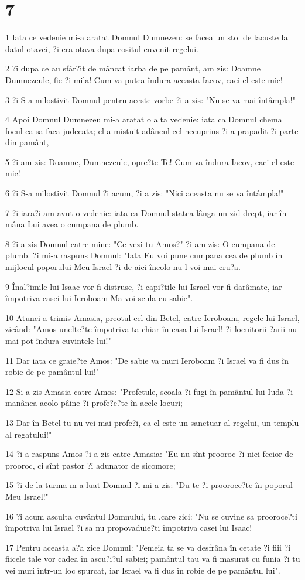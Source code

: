 \chapter{7}

\par 1 Iata ce vedenie mi-a aratat Domnul Dumnezeu: se facea un stol de lacuste la datul otavei, ?i era otava dupa cositul cuvenit regelui.
\par 2 ?i dupa ce au sfâr?it de mâncat iarba de pe pamânt, am zis: Doamne Dumnezeule, fie-?i mila! Cum va putea îndura aceasta Iacov, caci el este mic!
\par 3 ?i S-a milostivit Domnul pentru aceste vorbe ?i a zis: "Nu se va mai întâmpla!"
\par 4 Apoi Domnul Dumnezeu mi-a aratat o alta vedenie: iata ca Domnul chema focul ca sa faca judecata; el a mistuit adâncul cel necuprins ?i a prapadit ?i parte din pamânt,
\par 5 ?i am zis: Doamne, Dumnezeule, opre?te-Te! Cum va îndura Iacov, caci el este mic!
\par 6 ?i S-a milostivit Domnul ?i acum, ?i a zis: "Nici aceasta nu se va întâmpla!"
\par 7 ?i iara?i am avut o vedenie: iata ca Domnul statea lânga un zid drept, iar în mâna Lui avea o cumpana de plumb.
\par 8 ?i a zis Domnul catre mine: "Ce vezi tu Amos?" ?i am zis: O cumpana de plumb. ?i mi-a raspuns Domnul: "Iata Eu voi pune cumpana cea de plumb în mijlocul poporului Meu Israel ?i de aici încolo nu-l voi mai cru?a.
\par 9 Înal?imile lui Isaac vor fi distruse, ?i capi?tile lui Israel vor fi darâmate, iar împotriva casei lui Ieroboam Ma voi scula cu sabie".
\par 10 Atunci a trimis Amasia, preotul cel din Betel, catre Ieroboam, regele lui Israel, zicând: "Amos unelte?te împotriva ta chiar în casa lui Israel! ?i locuitorii ?arii nu mai pot îndura cuvintele lui!"
\par 11 Dar iata ce graie?te Amos: "De sabie va muri Ieroboam ?i Israel va fi dus în robie de pe pamântul lui!"
\par 12 Si a zis Amasia catre Amos: "Profetule, scoala ?i fugi în pamântul lui Iuda ?i manânca acolo pâine ?i profe?e?te în acele locuri;
\par 13 Dar în Betel tu nu vei mai profe?i, ca el este un sanctuar al regelui, un templu al regatului!"
\par 14 ?i a raspuns Amos ?i a zis catre Amasia: "Eu nu sînt prooroc ?i nici fecior de prooroc, ci sînt pastor ?i adunator de sicomore;
\par 15 ?i de la turma m-a luat Domnul ?i mi-a zis: "Du-te ?i prooroce?te în poporul Meu Israel!"
\par 16 ?i acum asculta cuvântul Domnului, tu ,care zici: "Nu se cuvine sa prooroce?ti împotriva lui Israel ?i sa nu propovaduie?ti împotriva casei lui Isaac!
\par 17 Pentru aceasta a?a zice Domnul: "Femeia ta se va desfrâna în cetate ?i fiii ?i fiicele tale vor cadea în ascu?i?ul sabiei; pamântul tau va fi masurat cu funia ?i tu vei muri într-un loc spurcat, iar Israel va fi dus în robie de pe pamântul lui".

